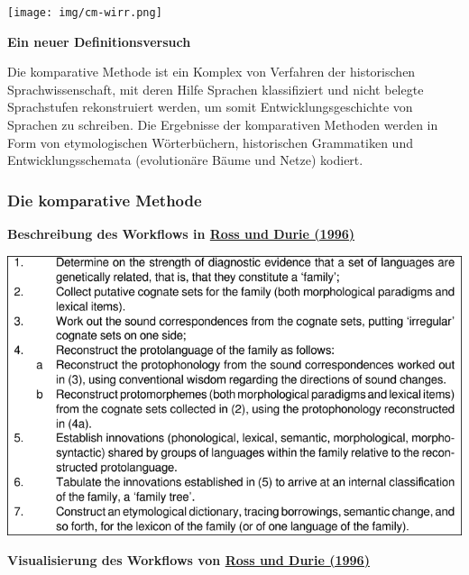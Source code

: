 \texttt{[image: img/cm-wirr.png]}



\vspace{0.5cm}\par\noindent\textbf{Ein neuer Definitionsversuch}\vspace{0.5cm}

Die komparative Methode ist ein Komplex von Verfahren der historischen
Sprachwissenschaft, mit deren Hilfe Sprachen klassifiziert und nicht
belegte Sprachstufen rekonstruiert werden, um somit
Entwicklungsgeschichte von Sprachen zu schreiben. Die Ergebnisse der
komparativen Methoden werden in Form von etymologischen Wörterbüchern,
historischen Grammatiken und Entwicklungsschemata (evolutionäre Bäume
und Netze) kodiert.


\subsubsection{\texorpdfstring{{Die komparative
Methode}}{Die komparative Methode}}

\vspace{0.5cm}\par\noindent\textbf{Beschreibung des Workflows in\vspace{0.5cm}
\href{http://bibliography.lingpy.org?key=Ross1996}{Ross und Durie
(1996)}}

\includegraphics[width=\textwidth]{img/rodu.pdf}



\vspace{0.5cm}\par\noindent\textbf{Visualisierung des Workflows von\vspace{0.5cm}
\href{http://bibliography.lingpy.org?key=Ross1996}{Ross und Durie
(1996)}}

